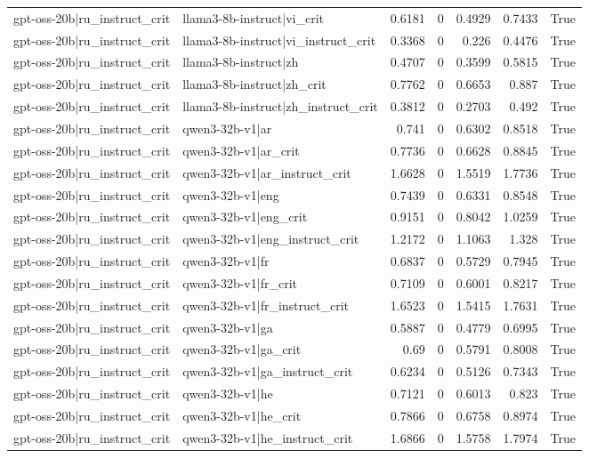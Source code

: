\begin{table}
\begin{tabular}{l l r r r r l}
gpt-oss-20b|ru_instruct_crit & llama3-8b-instruct|vi_crit & 0.6181 & 0 & 0.4929 & 0.7433 & True \\
gpt-oss-20b|ru_instruct_crit & llama3-8b-instruct|vi_instruct_crit & 0.3368 & 0 & 0.226 & 0.4476 & True \\
gpt-oss-20b|ru_instruct_crit & llama3-8b-instruct|zh & 0.4707 & 0 & 0.3599 & 0.5815 & True \\
gpt-oss-20b|ru_instruct_crit & llama3-8b-instruct|zh_crit & 0.7762 & 0 & 0.6653 & 0.887 & True \\
gpt-oss-20b|ru_instruct_crit & llama3-8b-instruct|zh_instruct_crit & 0.3812 & 0 & 0.2703 & 0.492 & True \\
gpt-oss-20b|ru_instruct_crit & qwen3-32b-v1|ar & 0.741 & 0 & 0.6302 & 0.8518 & True \\
gpt-oss-20b|ru_instruct_crit & qwen3-32b-v1|ar_crit & 0.7736 & 0 & 0.6628 & 0.8845 & True \\
gpt-oss-20b|ru_instruct_crit & qwen3-32b-v1|ar_instruct_crit & 1.6628 & 0 & 1.5519 & 1.7736 & True \\
gpt-oss-20b|ru_instruct_crit & qwen3-32b-v1|eng & 0.7439 & 0 & 0.6331 & 0.8548 & True \\
gpt-oss-20b|ru_instruct_crit & qwen3-32b-v1|eng_crit & 0.9151 & 0 & 0.8042 & 1.0259 & True \\
gpt-oss-20b|ru_instruct_crit & qwen3-32b-v1|eng_instruct_crit & 1.2172 & 0 & 1.1063 & 1.328 & True \\
gpt-oss-20b|ru_instruct_crit & qwen3-32b-v1|fr & 0.6837 & 0 & 0.5729 & 0.7945 & True \\
gpt-oss-20b|ru_instruct_crit & qwen3-32b-v1|fr_crit & 0.7109 & 0 & 0.6001 & 0.8217 & True \\
gpt-oss-20b|ru_instruct_crit & qwen3-32b-v1|fr_instruct_crit & 1.6523 & 0 & 1.5415 & 1.7631 & True \\
gpt-oss-20b|ru_instruct_crit & qwen3-32b-v1|ga & 0.5887 & 0 & 0.4779 & 0.6995 & True \\
gpt-oss-20b|ru_instruct_crit & qwen3-32b-v1|ga_crit & 0.69 & 0 & 0.5791 & 0.8008 & True \\
gpt-oss-20b|ru_instruct_crit & qwen3-32b-v1|ga_instruct_crit & 0.6234 & 0 & 0.5126 & 0.7343 & True \\
gpt-oss-20b|ru_instruct_crit & qwen3-32b-v1|he & 0.7121 & 0 & 0.6013 & 0.823 & True \\
gpt-oss-20b|ru_instruct_crit & qwen3-32b-v1|he_crit & 0.7866 & 0 & 0.6758 & 0.8974 & True \\
gpt-oss-20b|ru_instruct_crit & qwen3-32b-v1|he_instruct_crit & 1.6866 & 0 & 1.5758 & 1.7974 & True \\

\end{tabular}
\end{table}
